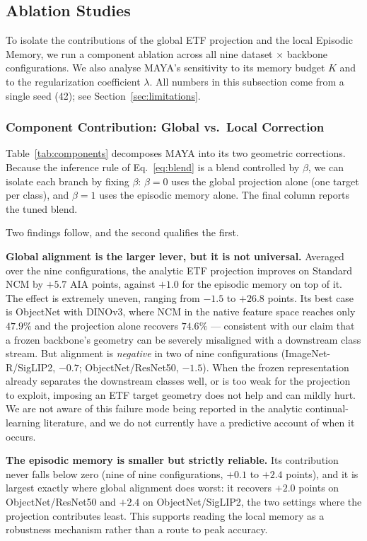 \subsection{Ablation Studies}
\label{sec:ablations}

To isolate the contributions of the global ETF projection and the local Episodic Memory, we run a component ablation across all nine dataset $\times$ backbone configurations. We also analyse MAYA's sensitivity to its memory budget $K$ and to the regularization coefficient $\lambda$. All numbers in this subsection come from a single seed (42); see Section~\ref{sec:limitations}.

\subsubsection{Component Contribution: Global vs.\ Local Correction}
Table~\ref{tab:components} decomposes MAYA into its two geometric corrections. Because the inference rule of Eq.~\ref{eq:blend} is a blend controlled by $\beta$, we can isolate each branch by fixing $\beta$: $\beta{=}0$ uses the global projection alone (one target per class), and $\beta{=}1$ uses the episodic memory alone. The final column reports the tuned blend.



Two findings follow, and the second qualifies the first.

\textbf{Global alignment is the larger lever, but it is not universal.} Averaged over the nine configurations, the analytic ETF projection improves on Standard NCM by $+5.7$ AIA points, against $+1.0$ for the episodic memory on top of it. The effect is extremely uneven, ranging from $-1.5$ to $+26.8$ points. Its best case is ObjectNet with DINOv3, where NCM in the native feature space reaches only $47.9\%$ and the projection alone recovers $74.6\%$ --- consistent with our claim that a frozen backbone's geometry can be severely misaligned with a downstream class stream. But alignment is \emph{negative} in two of nine configurations (ImageNet-R/SigLIP2, $-0.7$; ObjectNet/ResNet50, $-1.5$). When the frozen representation already separates the downstream classes well, or is too weak for the projection to exploit, imposing an ETF target geometry does not help and can mildly hurt. We are not aware of this failure mode being reported in the analytic continual-learning literature, and we do not currently have a predictive account of when it occurs.

\textbf{The episodic memory is smaller but strictly reliable.} Its contribution never falls below zero (nine of nine configurations, $+0.1$ to $+2.4$ points), and it is largest exactly where global alignment does worst: it recovers $+2.0$ points on ObjectNet/ResNet50 and $+2.4$ on ObjectNet/SigLIP2, the two settings where the projection contributes least. This supports reading the local memory as a robustness mechanism rather than a route to peak accuracy.

